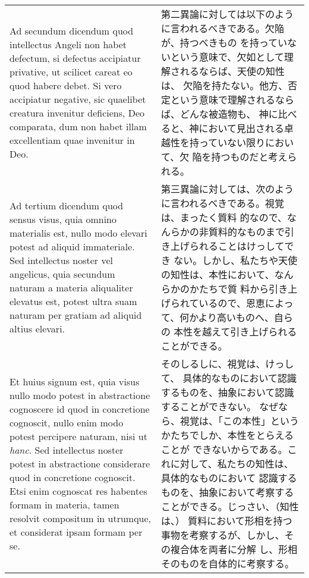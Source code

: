 \documentclass[10pt]{jsarticle} %
\begin{document}
\begin{longtable}{p{21em}p{21em}}
{\sc Ad secundum dicendum} quod intellectus Angeli non habet defectum,
si defectus accipiatur privative, ut scilicet careat eo quod habere
debet. Si vero accipiatur negative, sic quaelibet creatura invenitur
deficiens, Deo comparata, dum non habet illam excellentiam quae
invenitur in Deo.

&

第二異論に対しては以下のように言われるべきである。欠陥が、持つべきもの
を持っていないという意味で、欠如として理解されるならば、天使の知性は、
欠陥を持たない。他方、否定という意味で理解されるならば、どんな被造物も、
神に比べると、神において見出される卓越性を持っていない限りにおいて、欠
陥を持つものだと考えられる。

\\

{\sc Ad tertium dicendum} quod sensus visus, quia omnino materialis
est, nullo modo elevari potest ad aliquid immateriale. Sed intellectus
noster vel angelicus, quia secundum naturam a materia aliqualiter
elevatus est, potest ultra suam naturam per gratiam ad aliquid altius
elevari. 

&

第三異論に対しては、次のように言われるべきである。視覚は、まったく質料
的なので、なんらかの非質料的なものまで引き上げられることはけっしてでき
ない。しかし、私たちや天使の知性は、本性において、なんらかのかたちで質
料から引き上げられているので、恩恵によって、何かより高いものへ、自らの
本性を越えて引き上げられることができる。

\\

Et huius signum est, quia visus nullo modo potest in
abstractione cognoscere id quod in concretione cognoscit, nullo enim
modo potest percipere naturam, nisi ut {\it hanc}. Sed intellectus
noster potest in abstractione considerare quod in concretione
cognoscit. Etsi enim cognoscat res habentes formam in materia, tamen
resolvit compositum in utrumque, et considerat ipsam formam per se. 

&

そのしるしに、視覚は、けっして、
具体的なものにおいて認識するものを、抽象において認識することができない。
なぜなら、視覚は、「この本性」というかたちでしか、本性をとらえることが
できないからである。これに対して、私たちの知性は、具体的なものにおいて
認識するものを、抽象において考察することができる。じっさい、（知性は、）
質料において形相を持つ事物を考察するが、しかし、その複合体を両者に分解
し、形相そのものを自体的に考察する。

\\


\end{longtable}
\end{document}

